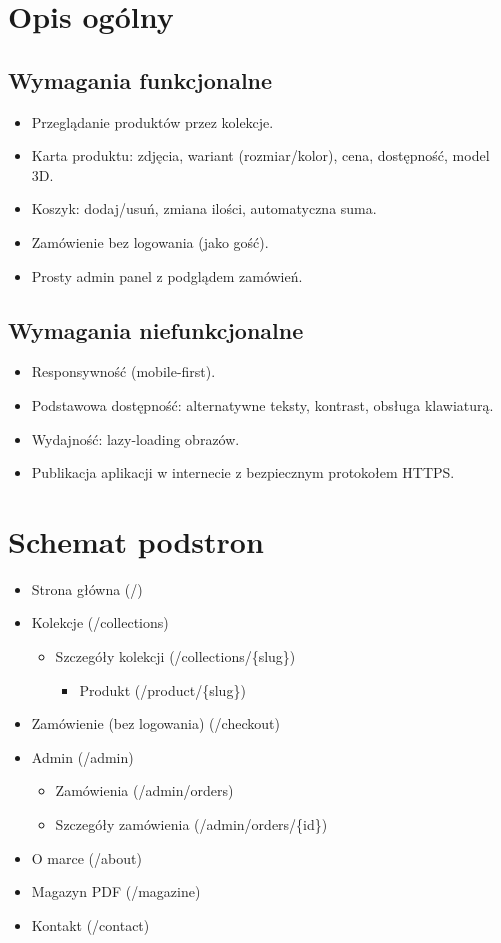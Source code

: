 \documentclass[14pt]{extarticle}
\begin{document}
	\section{Opis ogólny}
		\subsection{Wymagania funkcjonalne}
		\begin{itemize}
			\item Przeglądanie produktów przez kolekcje.
			\item Karta produktu: zdjęcia, wariant (rozmiar/kolor), cena, dostępność, model 3D.
			\item Koszyk: dodaj/usuń, zmiana ilości, automatyczna suma.
			\item Zamówienie bez logowania (jako gość).
			\item Prosty admin panel z podglądem zamówień.
		\end{itemize}

		\subsection{Wymagania niefunkcjonalne}
		\begin{itemize}
			\item Responsywność (mobile-first).
			\item Podstawowa dostępność: alternatywne teksty, kontrast, obsługa klawiaturą.
			\item Wydajność: lazy-loading obrazów.
			\item Publikacja aplikacji w internecie z bezpiecznym protokołem HTTPS.
		\end{itemize}
		
	\section{Schemat podstron}
		\begin{itemize}
			\item Strona główna (/)
			\item Kolekcje (/collections)
			\begin{itemize}
				\item Szczegóły kolekcji (/collections/\{slug\})
				\begin{itemize}
					\item Produkt (/product/\{slug\})
				\end{itemize}
			\end{itemize}
			\item Zamówienie (bez logowania) (/checkout)
			\item Admin (/admin)
			\begin{itemize}
				\item Zamówienia (/admin/orders)
				\item Szczegóły zamówienia (/admin/orders/\{id\})
			\end{itemize}
			\item O marce (/about)
			\item Magazyn PDF (/magazine)
			\item Kontakt (/contact)
		\end{itemize}
	
\end{document}
